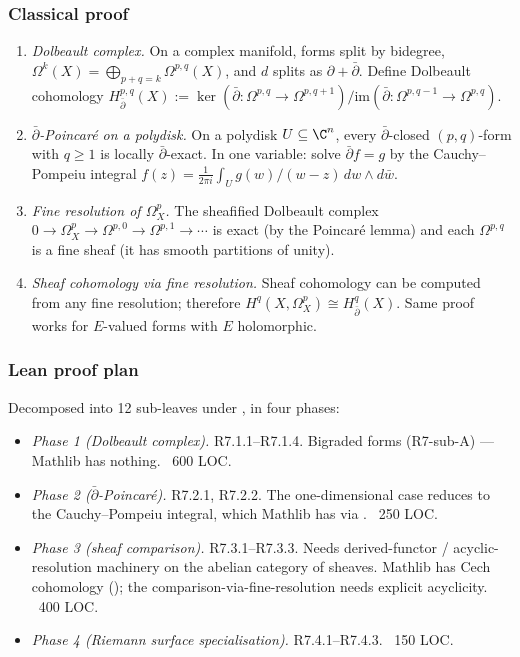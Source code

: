 \subsubsection*{Classical proof}

\begin{enumerate}
\item \emph{Dolbeault complex.}  On a complex manifold, forms split
  by bidegree, \(\Omega^k(X) = \bigoplus_{p+q=k} \Omega^{p,q}(X)\),
  and \(d\) splits as \(\partial + \bar\partial\).  Define
  Dolbeault cohomology \(H^{p,q}_{\bar\partial}(X) :=
  \ker(\bar\partial : \Omega^{p,q} \to \Omega^{p,q+1}) /
  \mathrm{im}(\bar\partial : \Omega^{p,q-1} \to \Omega^{p,q})\).
\item \emph{\(\bar\partial\)-Poincar\'e on a polydisk.}  On a polydisk
  \(U \subseteq \C^n\), every \(\bar\partial\)-closed
  \((p,q)\)-form with \(q \geq 1\) is locally
  \(\bar\partial\)-exact.  In one variable: solve
  \(\bar\partial f = g\) by the Cauchy--Pompeiu integral
  \(f(z) = \frac{1}{2\pi i} \int_U g(w)/(w - z) \, dw \wedge d\bar w\).
\item \emph{Fine resolution of \(\Omega^p_X\).}  The sheafified
  Dolbeault complex
  \(0 \to \Omega^p_X \to \Omega^{p,0} \to \Omega^{p,1} \to \cdots\)
  is exact (by the Poincar\'e lemma) and each \(\Omega^{p,q}\) is a
  fine sheaf (it has smooth partitions of unity).
\item \emph{Sheaf cohomology via fine resolution.}  Sheaf cohomology
  can be computed from any fine resolution; therefore
  \(H^q(X, \Omega^p_X) \cong H^q_{\bar\partial}(X)\).  Same proof
  works for \(E\)-valued forms with \(E\) holomorphic.
\end{enumerate}

\subsubsection*{Lean proof plan}

Decomposed into 12 sub-leaves under
, in four phases:

\begin{itemize}
\item \emph{Phase 1 (Dolbeault complex).}  R7.1.1--R7.1.4.  Bigraded
  forms (R7-sub-A) --- Mathlib has nothing.  ~600 LOC.
\item \emph{Phase 2 (\(\bar\partial\)-Poincar\'e).}  R7.2.1, R7.2.2.
  The one-dimensional case reduces to the Cauchy--Pompeiu integral,
  which Mathlib has via .
  ~250 LOC.
\item \emph{Phase 3 (sheaf comparison).}  R7.3.1--R7.3.3.  Needs
  derived-functor / acyclic-resolution machinery on the abelian
  category of sheaves.  Mathlib has Cech cohomology
  (); the comparison-via-fine-resolution
  needs explicit acyclicity.  ~400 LOC.
\item \emph{Phase 4 (Riemann surface specialisation).}
  R7.4.1--R7.4.3.  ~150 LOC.
\end{itemize}

